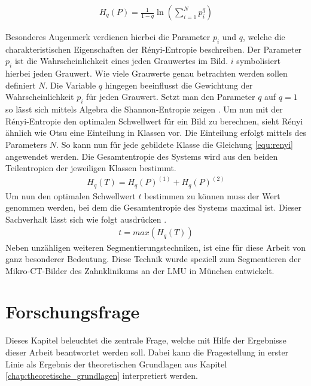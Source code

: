 \begin{align}
	\label{equ:renyi}H_{q}(P) = \frac{1}{1-q}\ln \left( \sum_{i=1}^{N}p_{i}^{q}\right)
\end{align}

Besonderes Augenmerk verdienen hierbei die Parameter $p_{i}$ und $q$, welche die
charakteristischen Eigenschaften der Rényi-Entropie beschreiben. Der Parameter
$p_{i}$ ist die Wahrscheinlichkeit eines jeden Grauwertes im Bild. $i$ symbolisiert
hierbei jeden Grauwert. Wie viele Grauwerte genau betrachten werden sollen
definiert $N$. Die Variable $q$ hingegen beeinflusst die Gewichtung der Wahrscheinlichkeit
$p_{i}$ für jeden Grauwert. Setzt man den Parameter $q$ auf $q = 1$ so lässt
sich mittels Algebra die Shannon-Entropie zeigen \citep[vgl.][K.~2]{bromiley2004}.
Um nun mit der Rényi-Entropie den optimalen Schwellwert für ein Bild zu
berechnen, sieht Rényi ähnlich wie Otsu eine Einteilung in Klassen vor. Die
Einteilung erfolgt mittels des Parameters $N$. So kann nun für jede gebildete Klasse
die Gleichung \ref{equ:renyi} angewendet werden. Die Gesamtentropie des Systems
wird aus den beiden Teilentropien der jeweiligen Klassen bestimmt\citep[vgl.][K.~2]{bromiley2004}.
\begin{align}
	H_{q}(T) = H_{q}(P)^{(1)}+ H_{q}(P)^{(2)}
\end{align}
Um nun den optimalen Schwellwert $t$ bestimmen zu können muss der Wert genommen werden,
bei dem die Gesamtentropie des Systems maximal ist. Dieser Sachverhalt lässt sich
wie folgt ausdrücken \citep[vgl.][K.~2]{bromiley2004}.
\begin{align}
	t = max(H_{q}(T))
\end{align}
Neben unzähligen weiteren Segmentierungstechniken, ist eine für diese Arbeit von
ganz besonderer Bedeutung. Diese Technik wurde speziell zum Segmentieren der Mikro-\ac{CT}-Bilder
des Zahnklinikums an der \ac{LMU} in München entwickelt.

\pagebreak

\chapter{Forschungsfrage}
\label{chap:fragestellung} Dieses Kapitel beleuchtet die zentrale Frage, welche
mit Hilfe der Ergebnisse dieser Arbeit beantwortet werden soll. Dabei kann die Fragestellung
in erster Linie als Ergebnis der theoretischen Grundlagen aus Kapitel \ref{chap:theoretische_grundlagen}
interpretiert werden.

